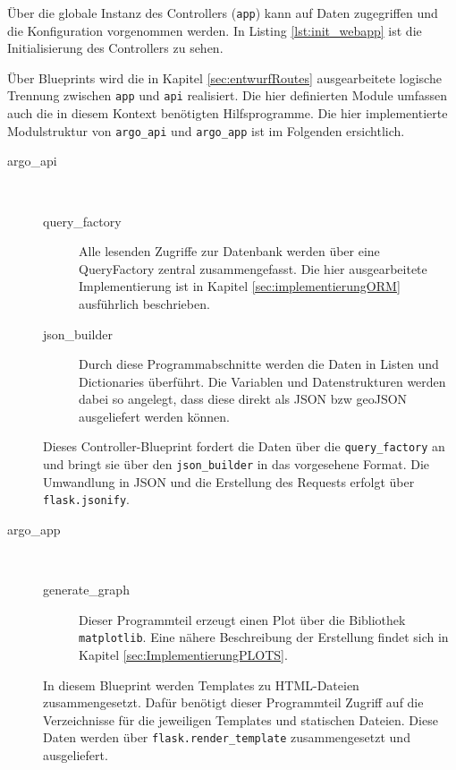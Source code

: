 

Über die globale Instanz des Controllers (\texttt{app}) kann auf Daten zugegriffen und die Konfiguration vorgenommen werden. In Listing \ref{lst:init_webapp} ist die Initialisierung des Controllers zu sehen.

Über Blueprints wird die in Kapitel \ref{sec:entwurfRoutes} ausgearbeitete logische Trennung zwischen \texttt{app} und \texttt{api} realisiert. Die hier definierten Module umfassen auch die in diesem Kontext benötigten Hilfsprogramme. Die hier implementierte Modulstruktur von \texttt{argo\_api} und \texttt{argo\_app} ist im Folgenden ersichtlich.

\begin{description}
 \item [argo\_api] $ $

    \begin{description}
     \item [query\_factory]
        Alle lesenden Zugriffe zur Datenbank werden über eine QueryFactory zentral zusammengefasst. Die hier ausgearbeitete Implementierung ist in Kapitel \ref{sec:implementierungORM} ausführlich beschrieben.

     \item [json\_builder]
        Durch diese Programmabschnitte werden die Daten in Listen und Dictionaries überführt. Die Variablen und Datenstrukturen werden dabei so angelegt, dass diese direkt als JSON bzw geoJSON ausgeliefert werden können.
    \end{description}

    Dieses Controller-Blueprint fordert die Daten über die \texttt{query\_factory} an und bringt sie über den \texttt{json\_builder} in das vorgesehene Format.  Die Umwandlung in JSON und die Erstellung des Requests erfolgt über \texttt{flask.jsonify}.
\pagebreak
 \item [argo\_app] $ $

    \begin{description}
     \item [generate\_graph] Dieser Programmteil erzeugt einen Plot über die Bibliothek \texttt{matplotlib}. Eine nähere Beschreibung der Erstellung findet sich in Kapitel \ref{sec:ImplementierungPLOTS}.
    \end{description}

    In diesem Blueprint werden Templates zu HTML-Dateien zusammengesetzt. Dafür benötigt dieser Programmteil Zugriff auf die Verzeichnisse für die jeweiligen Templates und statischen Dateien. Diese Daten werden über \texttt{flask.render\_template} zusammengesetzt und ausgeliefert.
\end{description}

